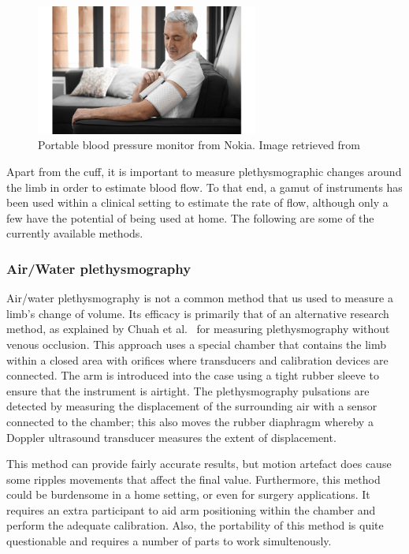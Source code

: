 \begin{figure}[!htpb]
	\centering
	\includegraphics[width=0.65\textwidth,keepaspectratio]{nokiabpm}    
	\caption[Nokia BPM+]{Portable blood pressure monitor from Nokia. Image retrieved from \cite{nokiabpm}}
	\label{fig:nokiabpm}
\end{figure}

Apart from the cuff, it is important to measure plethysmographic changes around the limb in order to estimate blood flow. To that end, a gamut of instruments has been used within a clinical setting to estimate the rate of flow, although only a few have the potential of being used at home. The following are some of the currently available methods.  

\subsubsection{Air/Water plethysmography}
\label{section literature air plethysmography}
Air/water plethysmography is not a common method that us used to measure a limb's change of volume. Its efficacy is primarily that of an alternative research method, as explained by Chuah et al.~\cite{chuah2004plethysmography} for measuring plethysmography without venous occlusion. This approach uses a special chamber that contains the limb within a closed area with orifices where transducers and calibration devices are connected. The arm is introduced into the case using a tight rubber sleeve to ensure that the instrument is airtight.  The plethysmography pulsations are detected by measuring the displacement of the surrounding air with a sensor connected to the chamber; this also moves the rubber diaphragm whereby a Doppler ultrasound transducer measures the extent of displacement. 

This method can provide fairly accurate results, but motion artefact does cause some ripples movements that affect the final value. Furthermore, this method could be burdensome in a home setting, or even for surgery applications. It requires an extra participant to aid arm positioning within the chamber and perform the adequate calibration. Also, the portability of this method is quite questionable and requires a number of parts to work simultenously.

